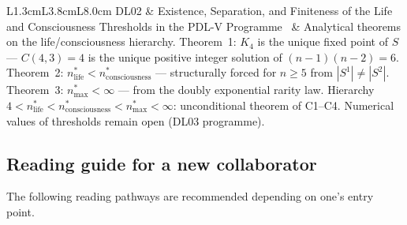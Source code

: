 \documentclass[11pt,a4paper]{article}
\theoremstyle{plain}
\theoremstyle{definition}
\theoremstyle{remark}
\begin{document}
\begin{longtable}{L{1.3cm}L{3.8cm}L{8.0cm}}
DL02 & Existence, Separation, and Finiteness of the Life and Consciousness Thresholds in the PDL-V Programme~\cite{DL02} & \textcolor{proofblue}{Analytical theorems} on the life/consciousness hierarchy. Theorem~1: $K_4$ is the unique fixed point of $S$ --- $C(4,3)=4$ is the unique positive integer solution of $(n-1)(n-2)=6$. Theorem~2: $n^*_{\mathrm{life}} < n^*_{\mathrm{consciousness}}$ --- structurally forced for $n \geq 5$ from $|S^1| \neq |S^2|$. Theorem~3: $n^*_{\mathrm{max}} < \infty$ --- from the doubly exponential rarity law. Hierarchy $4 < n^*_{\mathrm{life}} < n^*_{\mathrm{consciousness}} < n^*_{\mathrm{max}} < \infty$: unconditional theorem of C1--C4. Numerical values of thresholds remain open (DL03 programme).\\[0.4em]
\end{longtable}

\subsection{Reading guide for a new collaborator}
\label{subsec:readingguide}
The following reading pathways are recommended depending on one's entry point.
\end{document}
